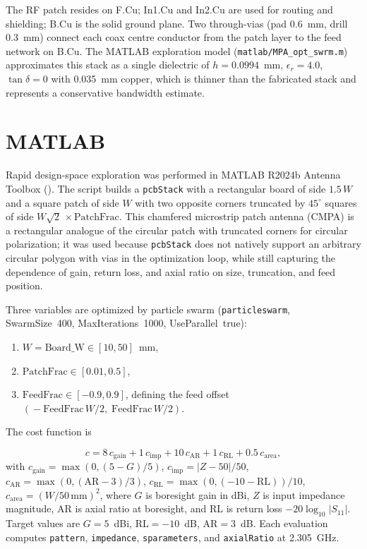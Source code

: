 The RF patch resides on F.Cu; In1.Cu and In2.Cu are used for routing and shielding; B.Cu is the solid ground plane. Two through-vias (pad $0.6$~mm, drill $0.3$~mm) connect each coax centre conductor from the patch layer to the feed network on B.Cu. The MATLAB exploration model (\texttt{matlab/MPA\_opt\_swrm.m}) approximates this stack as a single dielectric of $h=0.0994$~mm, $\epsilon_r=4.0$, $\tan\delta=0$ with 0.035~mm copper, which is thinner than the fabricated stack and represents a conservative bandwidth estimate.

\section{MATLAB}

Rapid design-space exploration was performed in MATLAB R2024b Antenna Toolbox (). The script builds a \texttt{pcbStack} with a rectangular board of side $1.5\,W$ and a square patch of side $W$ with two opposite corners truncated by $45^{\circ}$ squares of side $W\sqrt{2}\,\times\mathrm{PatchFrac}$. This chamfered microstrip patch antenna (CMPA) is a rectangular analogue of the circular patch with truncated corners for circular polarization; it was used because \texttt{pcbStack} does not natively support an arbitrary circular polygon with vias in the optimization loop, while still capturing the dependence of gain, return loss, and axial ratio on size, truncation, and feed position.

Three variables are optimized by particle swarm (\texttt{particleswarm}, SwarmSize~400, MaxIterations~1000, UseParallel~true):

\begin{enumerate}[itemsep=-1ex]
    \item $W = \mathrm{Board\_W} \in [10, 50]$~mm,
    \item $\mathrm{PatchFrac} \in [0.01, 0.5]$,
    \item $\mathrm{FeedFrac} \in [-0.9, 0.9]$, defining the feed offset $(\!- \mathrm{FeedFrac}\,W/2,\; \mathrm{FeedFrac}\,W/2)$.
\end{enumerate}

The cost function is

\begin{equation}
    c = 8\,c_{\mathrm{gain}} + 1\,c_{\mathrm{imp}} + 10\,c_{\mathrm{AR}} + 1\,c_{\mathrm{RL}} + 0.5\,c_{\mathrm{area}},
\end{equation}
with $c_{\mathrm{gain}}=\max(0,(5-G)/5)$, $c_{\mathrm{imp}}=|Z-50|/50$, $c_{\mathrm{AR}}=\max(0,(\mathrm{AR}-3)/3)$, $c_{\mathrm{RL}}=\max(0,(-10-\mathrm{RL}))/10$, $c_{\mathrm{area}}=(W/50\,\mathrm{mm})^{2}$, where $G$ is boresight gain in dBi, $Z$ is input impedance magnitude, AR is axial ratio at boresight, and RL is return loss $-20\log_{10}|S_{11}|$. Target values are $G=5$~dBi, RL${}=-10$~dB, AR${}=3$~dB. Each evaluation computes \texttt{pattern}, \texttt{impedance}, \texttt{sparameters}, and \texttt{axialRatio} at 2.305~GHz.

